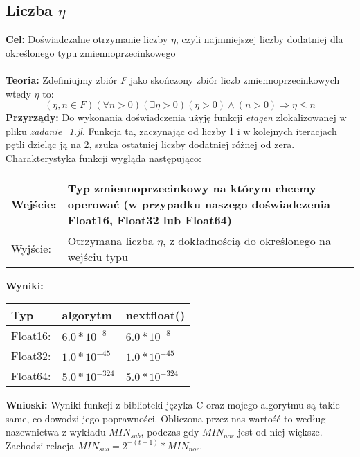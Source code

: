 \documentclass{article}
\begin{document}
\subsection{Liczba $\eta$}
\noindent \textbf{Cel:} Doświadczalne otrzymanie liczby $\eta$, czyli najmniejszej liczby dodatniej dla określonego typu zmiennoprzecinkowego \\\\
\noindent \textbf{Teoria:} Zdefiniujmy zbiór \textit{F} jako skończony zbiór liczb zmiennoprzecinkowych wtedy $\textbf{$\eta$}$ to:
$$ (\eta,n \in F)(\forall n > 0)(\exists \eta > 0)(\eta > 0)\land (n > 0) \Rightarrow \eta \leq n $$
\noindent \textbf{Przyrządy:} Do wykonania doświadczenia użyję funkcji \textit{etagen} zlokalizowanej w pliku \textit{zadanie\_1.jl}. Funkcja ta, zaczynając od liczby 1 i w kolejnych iteracjach pętli dzieląc ją na 2, szuka ostatniej liczby dodatniej różnej od zera. Charakterystyka funkcji wygląda następująco:\\
\begin{center}
  \begin{tabular}{|p{3cm}|p{8cm}|} \hline
    Wejście: & Typ zmiennoprzecinkowy na którym chcemy operować (w przypadku naszego doświadczenia Float16, Float32 lub Float64) \\
    \hline \hline
    Wyjście: & Otrzymana liczba $\eta$, z dokładnością do określonego na wejściu typu \\
    \hline
  \end{tabular}
\end{center}
\noindent \textbf{Wyniki:}\\
\begin{center}
  \begin{tabular}{|p{3cm}|p{4cm}|p{4cm}|} \hline
    \textbf{Typ} & \textbf{algorytm} & \textbf{nextfloat()} \\
    \hline
    Float16: & $6.0 * 10^{-8}$ &  $6.0 * 10^{-8}$ \\
    \hline
    Float32: & $1.0 * 10^{-45}$ &  $1.0 * 10^{-45}$ \\
    \hline
    Float64: &$ 5.0 * 10^{-324}$ & $5.0 * 10^{-324}$  \\
    \hline
  \end{tabular}
\end{center}
\noindent \textbf{Wnioski:} Wyniki funkcji z biblioteki języka C oraz mojego algorytmu są takie same, co dowodzi jego poprawności. Obliczona przez nas wartość to według nazewnictwa z wykładu $MIN_{sub}$, podczas gdy $MIN_{nor}$ jest od niej większe. Zachodzi relacja $MIN_{sub} = 2^{-(t-1)}*MIN_{nor}$.
\end{document}
